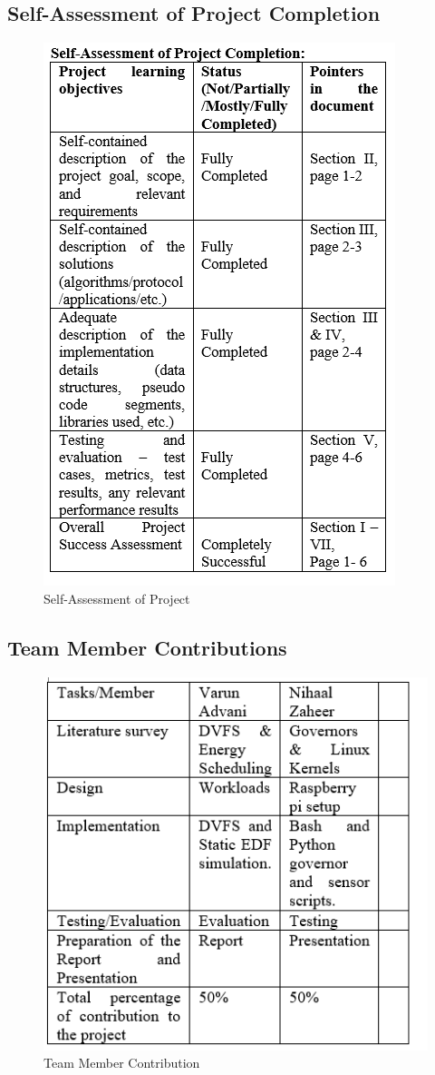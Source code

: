 \documentclass[conference]{IEEEtran}
\begin{document}
\subsection{Self-Assessment of Project Completion}
\begin{figure}[ht]
    \centering
    \includegraphics[width=0.75\linewidth]{self_reflection.png}
    \caption{Self-Assessment of Project}
    \label{fig:self_assess}
\end{figure}

\subsection{Team Member Contributions}
\begin{figure}[ht]
    \centering
    \includegraphics[width=0.75\linewidth]{team_member_contrib.png}
    \caption{Team Member Contribution}
    \label{fig:contrib}
\end{figure}
\end{document}
